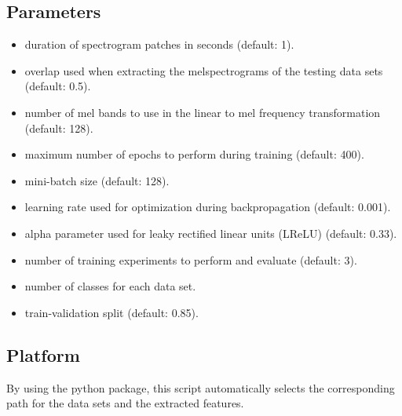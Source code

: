\documentclass[letterpaper,10pt,english]{sphinxmanual}
\begin{document}
\subsection{Parameters}
\label{\detokenize{settings:parameters}}\begin{itemize}
\item {} 
 duration of spectrogram patches in seconds (default: 1).

\item {} 
 overlap used when extracting the melspectrograms of the testing data sets (default: 0.5).

\item {} 
 number of mel bands to use in the linear to mel frequency transformation (default: 128).

\item {} 
 maximum number of epochs to perform during training (default: 400).

\item {} 
 mini-batch size (default: 128).

\item {} 
 learning rate used for optimization during backpropagation (default: 0.001).

\item {} 
 alpha parameter used for leaky rectified linear units (LReLU) (default: 0.33).

\item {} 
 number of training experiments to perform and evaluate (default: 3).

\item {} 
 number of classes for each data set.

\item {} 
 train-validation split (default: 0.85).

\end{itemize}


\subsection{Platform}
\label{\detokenize{settings:platform}}
By using the  python package, this script automatically selects the corresponding
path for the data sets and the extracted features.
\end{document}
